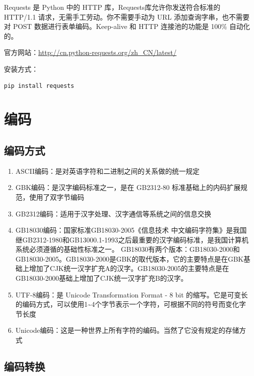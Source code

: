 \documentclass[]{ctexbook}
\providecommand{\tightlist}{%
  \setlength{\itemsep}{0pt}\setlength{\parskip}{0pt}}
\begin{document}
Requests 是 Python 中的 HTTP 库，Requests库允许你发送符合标准的 HTTP/1.1 请求，无需手工劳动。你不需要手动为 URL 添加查询字串，也不需要对 POST 数据进行表单编码。Keep-alive 和 HTTP 连接池的功能是 100\% 自动化的。

官方网站：\url{http://cn.python-requests.org/zh_CN/latest/}

安装方式：

\begin{verbatim}
pip install requests
\end{verbatim}

\hypertarget{ux7f16ux7801}{%
\section{编码}\label{ux7f16ux7801}}

\hypertarget{ux7f16ux7801ux65b9ux5f0f}{%
\subsection{编码方式}\label{ux7f16ux7801ux65b9ux5f0f}}

\begin{enumerate}
\def\labelenumi{\arabic{enumi}.}
\tightlist
\item
  ASCII编码：是对英语字符和二进制之间的关系做的统一规定
\item
  GBK编码：是汉字编码标准之一，是在 GB2312-80 标准基础上的内码扩展规范，使用了双字节编码
\item
  GB2312编码：适用于汉字处理、汉字通信等系统之间的信息交换
\item
  GB18030编码：国家标准GB18030-2005《信息技术 中文编码字符集》是我国继GB2312-1980和GB13000.1-1993之后最重要的汉字编码标准，是我国计算机系统必须遵循的基础性标准之一。 GB18030有两个版本：GB18030-2000和GB18030-2005。GB18030-2000是GBK的取代版本，它的主要特点是在GBK基础上增加了CJK统一汉字扩充A的汉字。GB18030-2005的主要特点是在GB18030-2000基础上增加了CJK统一汉字扩充B的汉字。
\item
  UTF-8编码：是 Unicode Transformation Format - 8 bit 的缩写。它是可变长的编码方式，可以使用1\textasciitilde4个字节表示一个字符，可根据不同的符号而变化字节长度
\item
  Unicode编码：这是一种世界上所有字符的编码。当然了它没有规定的存储方式
\end{enumerate}

\hypertarget{ux7f16ux7801ux8f6cux6362}{%
\subsection{编码转换}\label{ux7f16ux7801ux8f6cux6362}}
\end{document}
